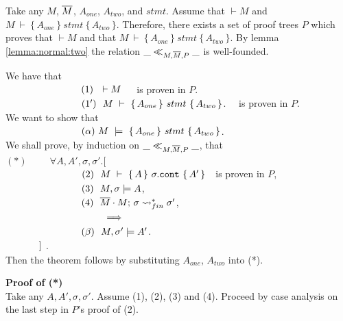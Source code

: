Take any $M$, $\overline{M}$, $A_{one}$, $A_{two}$, and $stmt$. Assume that $\vdash M$  and 
$M\ \vdash\  \{\, A_{one} \,  \}\ stmt\  \{\, A_{two} \, \}$.
Therefore, there exists a set of
proof trees $P$ which proves that $\vdash M$ and that $M\ \vdash\  \{\, A_{one} \,  \}\ stmt\  \{\, A_{two}\, \}$.
By lemma \ref{lemma:normal:two} the relation $\_ \ll_{M,\overline{M},P}  \_$ is well-founded.
 
 We have that \\
 $\strut \ \ \hspace{2.3cm} \ \ (1) \ \ \vdash M $\ \ \  is proven in $P$.\\
$\strut \ \ \hspace{2.3cm} \ \ (1') \ \ M\ \vdash\  \{\, A_{one} \,  \}\ stmt\  \{\, A_{two} \, \}$. \ \  is proven in $P$.
\\
We want to show  that\\
 $\strut \ \ \hspace{2.3cm} \ \ (\alpha) \  M\ \models\  \{\, A_{one} \,  \}\ stmt\  \{\, A_{two} \, \}$. 
 \\ 
We shall prove,  by induction on $\_ \ll_{M,\overline{M},P}  \_$, that 
\\ 
$(*) \hspace{1cm} \forall A, A', \sigma, \sigma'.[$\\
$\strut \ \ \hspace{2.3cm} \ \ (2) \ \ M\ \vdash\  \{\, A \,  \}\ \sigma.\prg{cont}\  \{\, A' \, \}\ \ $ is proven in $P$,\\
$\strut \ \ \hspace{2.3cm} \ \ (3) \ \ M, \sigma \models A$, \\
$\strut \ \ \hspace{2.3cm} \ \ (4) \ \ \leadstoBoundedStarFin {\Mtwo\cdot M}  {\sigma}  {\sigma'}$,\\
$\strut \ \ \hspace{2.3cm} \ \ \ \ \ \ \ \ \ \Longrightarrow$\\
$\strut  \ \ \hspace{2.3cm} \ \ (\beta)\ \  M, \sigma' \models A'$.\\
$\strut \ \   \hspace{1cm} ]$
.
\\
Then the  theorem follows by substituting $A_{one}$, $A_{two}$ into (*).

\vspace{.1cm}
\noindent
\textbf{Proof of (*)}\\
Take any $A, A', \sigma, \sigma'$. Assume  (1), (2), (3) and (4).
Proceed by case analysis on the last step in $P$'s proof of (2).


